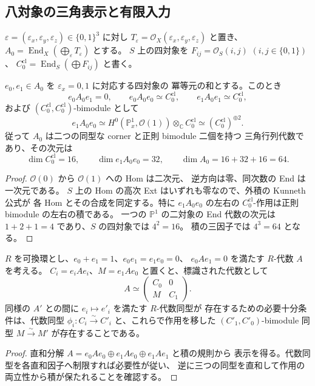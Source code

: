 \subsection{八対象の三角表示と有限入力}

$\varepsilon=(\varepsilon_x,\varepsilon_y,\varepsilon_z)\in\{0,1\}^3$ に対し
$T_\varepsilon=\mathcal O_X(\varepsilon_x,\varepsilon_y,\varepsilon_z)$ と置き、
$A_0=\operatorname{End}_X(\bigoplus_\varepsilon T_\varepsilon)$ とする。
$S$ 上の四対象を $F_{ij}=\mathcal O_S(i,j)$ $(i,j\in\{0,1\})$、
$C_0^{\mathrm{cl}}=\operatorname{End}_S(\bigoplus F_{ij})$ と書く。

\begin{proposition}
\label{pcc:prop:triangular-classical}
$e_0,e_1\in A_0$ を $\varepsilon_x=0,1$ に対応する四対象の
冪等元の和とする。このとき
\[
 e_0A_0e_1=0,\qquad
 e_0A_0e_0\simeq C_0^{\mathrm{cl}},\qquad
 e_1A_0e_1\simeq C_0^{\mathrm{cl}},
\]
および $(C_0^{\mathrm{cl}},C_0^{\mathrm{cl}})$-bimodule として
\[
 e_1A_0e_0\simeq
 H^0(\mathbb P^1_x,\mathcal O(1))\otimes_{\mathbb C}C_0^{\mathrm{cl}}
 \simeq(C_0^{\mathrm{cl}})^{\oplus2}.
\]
従って $A_0$ は二つの同型な corner と正則 bimodule 二個を持つ
三角行列代数であり、その次元は
\[
 \dim C_0^{\mathrm{cl}}=16,\qquad
 \dim e_1A_0e_0=32,\qquad \dim A_0=16+32+16=64.
\]
\end{proposition}
\begin{proof}
$\mathcal O(0)$ から $\mathcal O(1)$ への Hom は二次元、
逆方向は零、同次数の End は一次元である。
$S$ 上の Hom の高次 Ext はいずれも零なので、外積の Kunneth 公式が
各 Hom とその合成を同定する。特に $e_1A_0e_0$ の左右の
$C_0^{\mathrm{cl}}$-作用は正則 bimodule の左右の積である。
一つの $\mathbb P^1$ の二対象の End 代数の次元は
$1+2+1=4$ であり、$S$ の四対象では $4^2=16$。
積の三因子では $4^3=64$ となる。
\end{proof}

\begin{lemma}
\label{pcc:lem:triangular-criterion}
$R$ を可換環とし、$e_0+e_1=1$、$e_0e_1=e_1e_0=0$、
$e_0Ae_1=0$ を満たす $R$-代数 $A$ を考える。
$C_i=e_iAe_i$、$M=e_1Ae_0$ と置くと、標識された代数として
\[
 A\simeq
 \begin{pmatrix}C_0&0\\M&C_1\end{pmatrix}.
\]
同様の $A'$ との間に $e_i\mapsto e'_i$ を満たす $R$-代数同型が
存在するための必要十分条件は、代数同型
$\phi_i:C_i\xrightarrow{\sim}C'_i$ と、これらで作用を移した
$(C'_1,C'_0)$-bimodule 同型
$M\xrightarrow{\sim}M'$ が存在することである。
\end{lemma}
\begin{proof}
直和分解 $A=e_0Ae_0\oplus e_1Ae_0\oplus e_1Ae_1$ と積の規則から
表示を得る。代数同型を各直和因子へ制限すれば必要性が従い、
逆に三つの同型を直和して作用の両立性から積が保たれることを確認する。
\end{proof}

